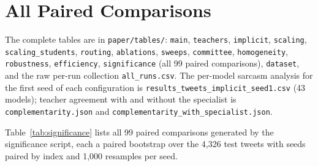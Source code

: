 \chapter{All Paired Comparisons}

\label{app:significance}

The complete tables are in \texttt{paper/tables/}: \texttt{main}, \texttt{teachers},
\texttt{implicit}, \texttt{scaling}, \texttt{scaling\_students}, \texttt{routing},
\texttt{ablations}, \texttt{sweeps}, \texttt{committee}, \texttt{homogeneity}, \texttt{robustness},
\texttt{efficiency}, \texttt{significance} (all 99 paired comparisons), \texttt{dataset}, and the
raw per-run collection \texttt{all\_runs.csv}. The per-model sarcasm analysis for the first seed of
each configuration is \texttt{results\_tweets\_implicit\_seed1.csv} (43 models); teacher agreement
with and without the specialist is \texttt{complementarity.json} and
\texttt{complementarity\_with\_specialist.json}.

Table~\ref{tab:significance} lists all 99 paired comparisons generated by the significance script,
each a paired bootstrap over the 4,326 test tweets with seeds paired by index and 1,000 resamples
per seed.


